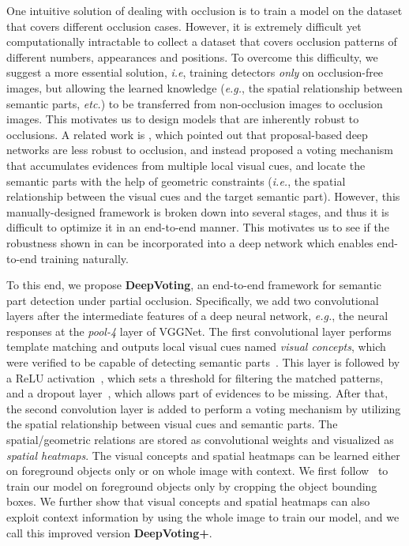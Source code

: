 \documentclass[10pt,twocolumn,letterpaper]{article}
\begin{document}
  One intuitive solution of dealing with occlusion is to train a model on the dataset that covers different occlusion cases. However, it is extremely difficult yet computationally intractable to collect a dataset that covers occlusion patterns of different numbers, appearances and positions. To overcome this difficulty, we suggest a more essential solution, {\em i.e}, training detectors {\em only} on occlusion-free images, but allowing the learned knowledge ({\em e.g.}, the spatial relationship between semantic parts, {\em etc.}) to be transferred from non-occlusion images to occlusion images. This motivates us to design models that are inherently robust to occlusions. A related work is \cite{wang2017detecting}, which pointed out that proposal-based deep networks are less robust to occlusion, and instead proposed a voting mechanism that accumulates evidences from multiple local visual cues, and locate the semantic parts with the help of geometric constraints ({\em i.e.}, the spatial relationship between the visual cues and the target semantic part). However, this manually-designed framework is broken down into several stages, and thus it is difficult to optimize it in an end-to-end manner. This motivates us to see if the robustness shown in \cite{wang2017detecting} can be incorporated into a deep network which enables end-to-end training naturally.

  To this end, we propose {\bf DeepVoting}, an end-to-end framework for semantic part detection under partial occlusion. Specifically, we add two convolutional layers after the intermediate features of a deep neural network, {\em e.g.}, the neural responses at the {\em pool-4} layer of VGGNet. The first convolutional layer performs template matching and outputs local visual cues named {\em visual concepts}, which were verified to be capable of detecting semantic parts~\cite{Wang_2017_VC_journal}. This layer is followed by a ReLU activation~\cite{Nair_2010_Rectified}, which sets a threshold for filtering the matched patterns, and a dropout layer~\cite{Srivastava_2014_Dropout}, which allows part of evidences to be missing. After that, the second convolution layer is added to perform a voting mechanism by utilizing the spatial relationship between visual cues and semantic parts. The spatial/geometric relations are stored as convolutional weights and visualized as {\em spatial heatmaps}.
  The visual concepts and spatial heatmaps can be learned either on foreground objects only or on whole image with context. We first follow~\cite{wang2017detecting} to train our model on foreground objects only by cropping the object bounding boxes. We further show that visual concepts and spatial heatmaps can also exploit context information by using the whole image to train our model, and we call this improved version {\bf DeepVoting+}.
\end{document}
